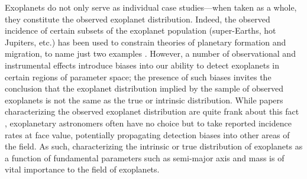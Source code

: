 \documentclass[12pt,manuscript]{aastex}
\begin{document}
Exoplanets do not only serve as individual case studies---when taken as a whole, they constitute the observed exoplanet distribution.
Indeed, the observed incidence of certain subsets of the exoplanet population (super-Earths, hot Jupiters, etc.) has been used to constrain theories of planetary formation and migration, to name just two examples \citep{ida&lin04,boley16}.
However, a number of observational and instrumental effects introduce biases into our ability to detect exoplanets in certain regions of parameter space; the presence of such biases invites the conclusion that the exoplanet distribution implied by the sample of observed exoplanets is not the same as the true or intrinsic distribution.
While papers characterizing the observed exoplanet distribution are quite frank about this fact \citep[e.g.][]{marcy05,winn&fabrycky15}, exoplanetary astronomers often have no choice but to take reported incidence rates at face value, potentially propagating detection biases into other areas of the field.
As such, characterizing the intrinsic or true distribution of exoplanets as a function of fundamental parameters such as semi-major axis and mass is of vital importance to the field of exoplanets. 

\end{document}
